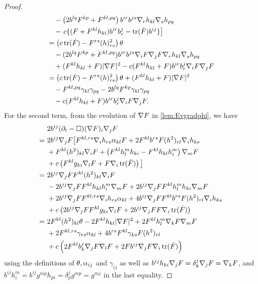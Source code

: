 \documentclass{amsart}
\begin{document}
\begin{proof}
\begin{equation}
\begin{split}
& \quad - \left(2b^{lq}F^{kp} + F^{kl,pq}\right) b^{ir}b^{js} \nabla_r h_{kl} \nabla_s h_{pq} \\
& \quad - \left. c \{(F + F^{kl}h_{kl}) b^{ir}b^{j}_{r} - \operatorname{tr}(\dot{F}) b^{ij}\}\right] \\
&= \left(c\operatorname{tr}(\dot{F}) - F^{rs}(h)^2_{rs}\right) \theta\\ & \quad - (2b^{lq}F^{kp} + F^{kl,pq}) b^{ir}b^{js}\nabla_iF\nabla_jF\nabla_rh_{kl}\nabla_s h_{pq} \\
&\quad + (F^{kl}h_{kl} + F)|\nabla F|^{2} - c(F^{kl}h_{kl} + F)b^{ir}b^{j}_{r}\nabla_i F\nabla_jF \\
&= \left(c\operatorname{tr}(\dot{F}) - F^{rs}(h)^2_{rs}\right) \theta  + (F^{kl}h_{kl} + F)|\nabla F|^{2} \\
&\quad - F^{kl,pq} \gamma_{kl} \gamma_{pq} - 2b^{lq}F^{kp} \gamma_{kl} \gamma_{pq}  \\ 
&\quad -c(F^{kl}h_{kl} + F)b^{ir}b^{j}_{r}\nabla_i F\nabla_jF.
\end{split}
\end{equation}
For the second term, from the evolution of \(\nabla F\) in \cref{lem:Evgradphi}, we have
\begin{equation}
\label{eq:delt_theta2}
\begin{split}
&2 b^{ij} (\partial_{t} - \Box) (\nabla F)_i \nabla_jF\\  
=\ &2 b^{ij} \nabla_jF \big[F^{kl,rs}\nabla_i h_{rs} \alpha_{kl}F + 2 F^{kl} b^{rs} F(h^2)_{rl} \nabla_i h_{ks}  \\
\quad &+ F^{kl}(h^2)_{kl}\nabla_i F + \left(F^{kl}h^{m}_{l}h_{ki} - F^{kl}h_{kl}h^{m}_{i}\right) \nabla_m F\\
\quad &+ c\left(F^{kl}g_{ki} \nabla_l F + F \nabla_i \operatorname{tr}(\dot{F})\right)\big] \\
=\ &2 b^{ij} \nabla_jF F^{kl}(h^2)_{kl}\nabla_i F \\
\quad &- 2 b^{ij} \nabla_jF F^{kl}h_{kl}h^{m}_{i} \nabla_m F + 2 b^{ij} \nabla_jF F^{kl}h^{m}_{l}h_{ki} \nabla_m F \\
\quad &+ 2 b^{ij} \nabla_jF F^{kl,rs}\nabla_i h_{rs} \alpha_{kl}  + 4 b^{ij} \nabla_jF F^{kl} b^{rs} F(h^2)_{rl} \nabla_i h_{ks} \\
\quad &+ c\left(2 b^{ij} \nabla_jF F^{kl}g_{ki} \nabla_l F + 2 b^{ij} \nabla_jF F \nabla_i \operatorname{tr}(\dot{F})\right) \\
=\ &2 F^{kl}(h^2)_{kl}\theta - 2 F^{kl}h_{kl} |\nabla F|^2 + 2 F^{kl} h^{m}_{l} \nabla_kF \nabla_m F \\
\quad &+ 2 F^{kl,rs} \gamma_{rs} \alpha_{kl} + 4 b^{rs} F^{kl} \gamma_{ks} F(h^2)_{rl} \\
\quad &+ c\left(2 F^{kl} b^j_k \nabla_jF \nabla_l F + 2 F b^{ij} \nabla_jF \nabla_i \operatorname{tr}(\dot{F})\right)
\end{split}
\end{equation}
using the definitions of \(\theta, \alpha_{ij}\) and \(\gamma_{ij}\) as well as \(b^{ij}h_{ki} \nabla_j F = \delta^j_k \nabla_j F = \nabla_k F\), and \(b^{ij} h^m_i = b^{ij} g^{mp}h_{pi} = \delta^j_p g^{mp} = g^{mj}\) in the last equality.


\end{proof}
\end{document}
